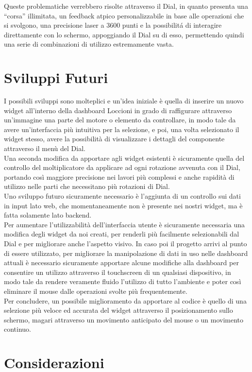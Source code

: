 Queste problematiche verrebbero risolte attraverso il Dial, in quanto presenta una “corsa” illimitata, un feedback atpico personalizzabile in base alle operazioni che si svolgono, una precisione laser a 3600 punti e la possibilitá di interagire direttamente con lo schermo, appoggiando il Dial su di esso, permettendo quindi una serie di combinazioni di utilizzo estremamente vasta.
\section{Sviluppi Futuri}

I possibili sviluppi sono molteplici e un’idea iniziale è quella di inserire un nuovo widget all’interno della dashboard Loccioni in grado di raffigurare attraverso un’immagine una parte del motore o elemento da controllare, in modo tale da avere un’interfaccia più intuitiva per la selezione, e poi, una volta selezionato il widget stesso, avere la possibilità di visualizzare i dettagli del componente attraverso il menù del Dial.\\
Una seconda modifica da apportare agli widget esistenti è sicuramente quella del controllo del moltiplicatore da applicare ad ogni rotazione avvenuta con il Dial, portando così maggiore precisione nei lavori più complessi e anche rapidità di utilizzo nelle parti che necessitano più rotazioni di Dial.\\
Uno sviluppo futuro sicuramente necessario è l’aggiunta di un controllo sui dati in input lato web, che momentaneamente non è presente nei nostri widget, ma è fatta solamente lato backend.\\
Per aumentare l’utilizzabilità dell’interfaccia utente è sicuramente necessaria una modifica degli widget da noi creati, per renderli più facilmente selezionabili dal Dial e per migliorare anche l’aspetto visivo.
In caso poi il progetto arrivi al punto di essere utilizzato, per migliorare la manipolazione di dati in uso nelle dashboard attuali è necessario sicuramente apportare alcune modifiche alla dashboard per consentire un utilizzo attraverso il touchscreen di un qualsiasi dispositivo, in modo tale da rendere veramente fluido l’utilizzo di tutto l’ambiente e poter così eliminare il mouse dalle operazioni svolte più frequentemente.\\
Per concludere, un possibile miglioramento da apportare al codice è quello di una selezione più veloce ed accurata del widget attraverso il posizionamento sullo schermo, magari attraverso un movimento anticipato del mouse o un movimento continuo.
\section{Considerazioni}

